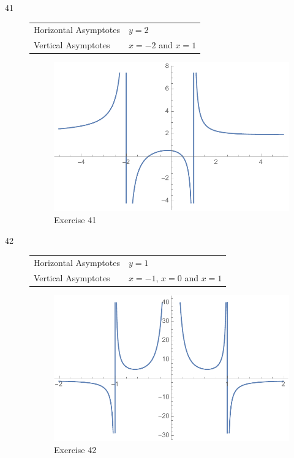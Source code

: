\documentclass[letterpaper, landscape]{exam}
\begin{document}
\begin{description}
      \item[41]
        \begin{tabular}[H]{ll}
          \toprule
          Horizontal Asymptotes & $y = 2$ \\
          Vertical Asymptotes   & $x = -2$ and $x = 1$ \\
          \bottomrule
        \end{tabular}

        \begin{figure}[H]
          \centering
          \includegraphics[scale = 0.5]{ex41.pdf}
          \caption{Exercise 41}
          \label{fig:ex41}
        \end{figure}

      \item[42]
        \begin{tabular}[H]{ll}
          \toprule
          Horizontal Asymptotes & $y = 1$ \\
          Vertical Asymptotes   & $x = -1$, $x = 0$ and $x = 1$ \\
          \bottomrule
        \end{tabular}

        \begin{figure}[H]
          \centering
          \includegraphics[scale = 0.5]{ex42.pdf}
          \caption{Exercise 42}
          \label{fig:ex42}
        \end{figure}


\end{description}
\end{document}
